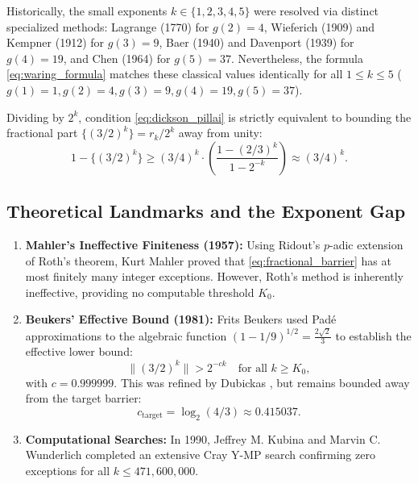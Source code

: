\documentclass[11pt,reqno]{article}
\theoremstyle{plain}
\theoremstyle{definition}
\numberwithin{equation}{section}
\begin{document}
Historically, the small exponents $k \in \{1, 2, 3, 4, 5\}$ were resolved via distinct specialized methods: Lagrange (1770) for $g(2)=4$, Wieferich (1909) and Kempner (1912) for $g(3)=9$, Baer (1940) and Davenport (1939) for $g(4)=19$, and Chen (1964) for $g(5)=37$. Nevertheless, the formula \eqref{eq:waring_formula} matches these classical values identically for all $1 \le k \le 5$ ($g(1)=1, g(2)=4, g(3)=9, g(4)=19, g(5)=37$).

Dividing by $2^k$, condition \eqref{eq:dickson_pillai} is strictly equivalent to bounding the fractional part $\{(3/2)^k\} = r_k / 2^k$ away from unity:
\begin{equation}\label{eq:fractional_barrier}
1 - \{(3/2)^k\} \ge (3/4)^k \cdot \left(\frac{1 - (2/3)^k}{1 - 2^{-k}}\right) \approx (3/4)^k.
\end{equation}

\subsection{Theoretical Landmarks and the Exponent Gap}
\begin{enumerate}
    \item \textbf{Mahler's Ineffective Finiteness (1957):} Using Ridout's $p$-adic extension of Roth's theorem, Kurt Mahler \cite{mahler1957} proved that \eqref{eq:fractional_barrier} has at most finitely many integer exceptions. However, Roth's method is inherently ineffective, providing no computable threshold $K_0$.
    \item \textbf{Beukers' Effective Bound (1981):} Frits Beukers \cite{beukers1981} used Pad\'e approximations to the algebraic function $(1 - 1/9)^{1/2} = \frac{2\sqrt{2}}{3}$ to establish the effective lower bound:
    \begin{equation}
    \|(3/2)^k\| > 2^{-c k} \quad \text{for all } k \ge K_0,
    \end{equation}
    with $c = 0.999999$. This was refined by Dubickas \cite{dubickas2006}, but remains bounded away from the target barrier:
    \begin{equation}
    c_{\mathrm{target}} = \log_2(4/3) \approx 0.415037.
    \end{equation}
    \item \textbf{Computational Searches:} In 1990, Jeffrey M. Kubina and Marvin C. Wunderlich \cite{kubina1990} completed an extensive Cray Y-MP search confirming zero exceptions for all $k \le 471{,}600{,}000$.
\end{enumerate}
\end{document}
